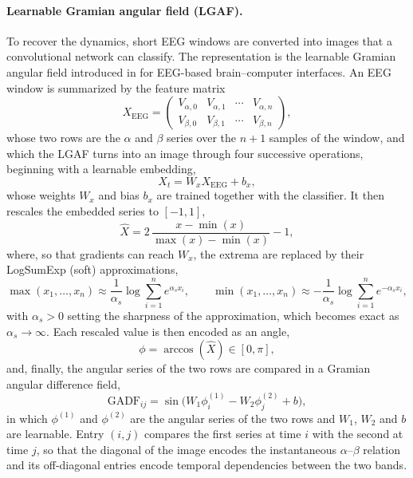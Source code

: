 \documentclass[utf8]{frontiers_suppmat}
\begin{document}
\paragraph*{Learnable Gramian angular field (LGAF).} To recover the dynamics, short EEG windows are converted into images that a convolutional network can classify. The representation is the learnable Gramian angular field introduced in \cite{HernandezGomez2025GAF} for EEG-based brain--computer interfaces. An EEG window is summarized by the feature matrix
\begin{equation}\label{eq:xeeg}
X_{\mathrm{EEG}}=\begin{pmatrix}V_{\alpha,0}&V_{\alpha,1}&\cdots&V_{\alpha,n}\\ V_{\beta,0}&V_{\beta,1}&\cdots&V_{\beta,n}\end{pmatrix},
\end{equation}
whose two rows are the $\alpha$ and $\beta$ series over the $n+1$ samples of the window, and which the LGAF turns into an image through four successive operations, beginning with a learnable embedding,
\begin{equation}\label{eq:lgaf_embed}
X_t=W_xX_{\mathrm{EEG}}+b_x ,
\end{equation}
whose weights $W_x$ and bias $b_x$ are trained together with the classifier. It then rescales the embedded series to $[-1,1]$,
\begin{equation}\label{eq:lgaf_scale}
\hat X=2\,\frac{x-\min(x)}{\max(x)-\min(x)}-1,
\end{equation}
where, so that gradients can reach $W_x$, the extrema are replaced by their LogSumExp (soft) approximations,
\begin{equation}\label{eq:lse}
\max(x_1,\dots,x_n)\approx\frac1{\alpha_s}\log\sum_{i=1}^{n}e^{\alpha_s x_i},\qquad \min(x_1,\dots,x_n)\approx-\frac1{\alpha_s}\log\sum_{i=1}^{n}e^{-\alpha_s x_i},
\end{equation}
with $\alpha_s>0$ setting the sharpness of the approximation, which becomes exact as $\alpha_s\to\infty$. Each rescaled value is then encoded as an angle,
\begin{equation}\label{eq:arccos}
\phi=\arccos(\hat X)\in[0,\pi],
\end{equation}
and, finally, the angular series of the two rows are compared in a Gramian angular difference field,
\begin{equation}\label{eq:gadf}
\mathrm{GADF}_{ij}=\sin\!\big(W_1\phi^{(1)}_i-W_2\phi^{(2)}_j+b\big),
\end{equation}
in which $\phi^{(1)}$ and $\phi^{(2)}$ are the angular series of the two rows and $W_1$, $W_2$ and $b$ are learnable. Entry $(i,j)$ compares the first series at time $i$ with the second at time $j$, so that the diagonal of the image encodes the instantaneous $\alpha$--$\beta$ relation and its off-diagonal entries encode temporal dependencies between the two bands.
\end{document}
